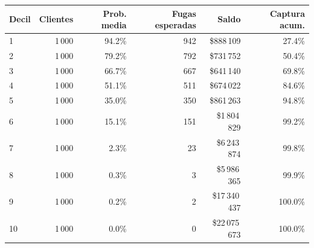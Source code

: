 \begin{tabular}{@{}lrrrrr@{}}
\toprule
\textbf{Decil} & \textbf{Clientes} & \textbf{Prob. media} & \textbf{Fugas esperadas} & \textbf{Saldo} & \textbf{Captura acum.} \\
\midrule
1 & 1\,000 & 94.2\% & 942 & \$888\,109 & 27.4\% \\
2 & 1\,000 & 79.2\% & 792 & \$731\,752 & 50.4\% \\
3 & 1\,000 & 66.7\% & 667 & \$641\,140 & 69.8\% \\
4 & 1\,000 & 51.1\% & 511 & \$674\,022 & 84.6\% \\
5 & 1\,000 & 35.0\% & 350 & \$861\,263 & 94.8\% \\
6 & 1\,000 & 15.1\% & 151 & \$1\,804\,829 & 99.2\% \\
7 & 1\,000 & 2.3\% & 23 & \$6\,243\,874 & 99.8\% \\
8 & 1\,000 & 0.3\% & 3 & \$5\,986\,365 & 99.9\% \\
9 & 1\,000 & 0.2\% & 2 & \$17\,340\,437 & 100.0\% \\
10 & 1\,000 & 0.0\% & 0 & \$22\,075\,673 & 100.0\% \\
\bottomrule
\end{tabular}